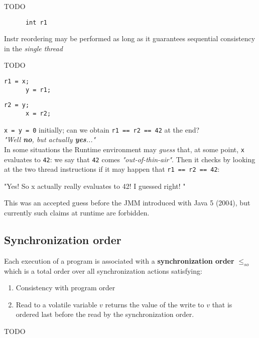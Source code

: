 TODO

\begin{paracol}{2}
   \begin{lstlisting}
      int r1
   \end{lstlisting}
\end{paracol}
Instr reordering may be performed as long as it guarantees sequential consistency in the \textit{single thread}

TODO

\begin{paracol}{2}
   \begin{lstlisting}[caption={Thread 1}]
      r1 = x;
      y = r1;
   \end{lstlisting}
\switchcolumn
   \begin{lstlisting}[caption={Thread 2}]
      r2 = y;
      x = r2;
   \end{lstlisting}
\end{paracol}
\lstinline|x = y = 0| initially;
can we obtain \lstinline|r1 == r2 == 42| at the end?\\
\textit{"Well \textbf{no}, but actually \textbf{yes}..."}\\
In some situations the Runtime environment may \textit{guess} that, 
at some point, \lstinline|x| evaluates to \lstinline|42|:
we say that \lstinline|42| comes \textit{"out-of-thin-air"}.
Then it checks by looking at the two thread instructions if it may happen that \lstinline|r1 == r2 == 42|:
\begin{center}
   "Yes! So x actually really evaluates to 42! I guessed right! \smiley"
\end{center}
This was an accepted guess before the JMM introduced with Java 5 (2004),
but currently such claims at runtime are forbidden.

\subsection{Synchronization order}
Each execution of a program is associated with a \textbf{synchronization order} $\leq_{so}$ which is a total order over all synchronization actions satisfying:
\begin{enumerate}
   \item Consistency with program order
   \item Read to a volatile variable $v$ returns the value of the write to $v$ that is ordered last before the read by the synchronization order.
\end{enumerate}
TODO

